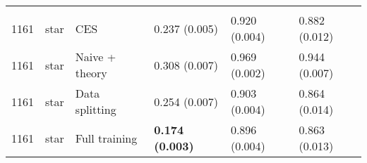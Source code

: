 \begin{tabular}[t]{rlllll}
\addlinespace[0.3em]
\multicolumn{6}{l}{\textbf{1161}}\\
\hspace{1em}1161 & star & CES & 0.237 (0.005) & 0.920 (0.004) & 0.882 (0.012)\\
\hspace{1em}1161 & star & Naive + theory & 0.308 (0.007) & 0.969 (0.002) & 0.944 (0.007)\\
\hspace{1em}1161 & star & Data splitting & 0.254 (0.007) & 0.903 (0.004) & 0.864 (0.014)\\
\hspace{1em}1161 & star & Full training & \textbf{0.174 (0.003)} & 0.896 (0.004) & 0.863 (0.013)\\
\bottomrule
\end{tabular}

